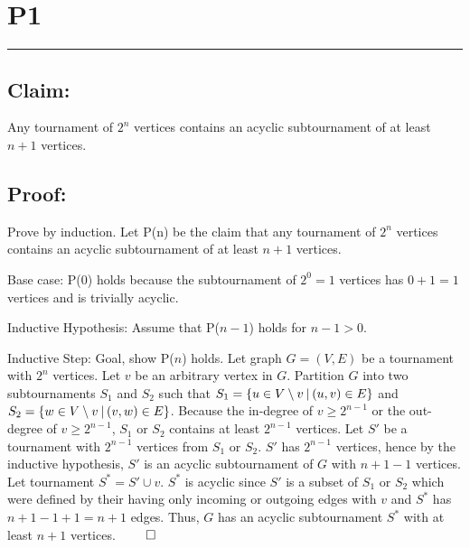 \documentclass[11pt]{article}
\title{}
\author{}
\date{}
\def\sm{\setminus}
\begin{document}
\section*{P1}

\noindent\textcolor[RGB]{220,220,220}{\rule{\linewidth}{0.8pt}}

\subsection*{Claim:} 

Any tournament of $2^n$ vertices contains an acyclic subtournament of at least $n + 1$ vertices. 

\subsection*{Proof:}

Prove by induction. Let P(n) be the claim that any tournament of $2^n$ vertices contains an acyclic subtournament of at least $n + 1$ vertices. 
\newline

Base case: P(0) holds because the subtournament of $2^{0} = 1$ vertices has $0 + 1 = 1$ vertices and is trivially acyclic.
\newline

Inductive Hypothesis: Assume that P($n-1$) holds for $n-1 > 0$. 
\newline

Inductive Step: Goal, show P($n$) holds. Let graph $G = (V, E)$ be a tournament with $2^n$ vertices. Let $v$ be an arbitrary vertex in $G$. Partition $G$ into two subtournaments $S_1$ and $S_2$ such that $S_1 = \{u \in V \sm v \hspace{0.2em}|\hspace{0.2em} (u, v) \in E\}$ and $S_2 = \{w \in V \sm v \hspace{0.2em}|\hspace{0.2em}  (v, w) \in E\}$. Because the in-degree of $v \geq 2^{n-1}$ or the out-degree of $v \geq 2^{n-1}$, $S_1$ or $S_2$ contains at least $2^{n-1}$ vertices. Let $S'$ be a tournament with $2^{n-1}$ vertices from $S_1$ or $S_2$. $S'$ has $2^{n-1}$ vertices, hence by the inductive hypothesis, $S'$ is an acyclic subtournament of $G$ with $n + 1 - 1$ vertices. Let tournament $S^* = S' \cup v$. $S^*$ is acyclic since $S'$ is a subset of $S_1$ or $S_2$ which were defined by their having only incoming or outgoing edges with $v$ and $S^*$ has $n + 1 - 1 + 1 = n + 1$ edges. Thus, $G$ has an acyclic subtournament $S^*$ with at least $n + 1$ vertices. $\qed$
\end{document}
